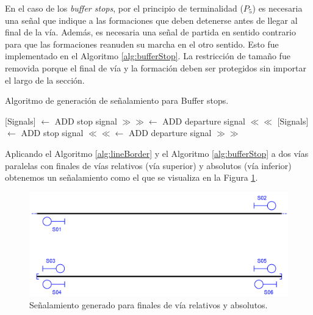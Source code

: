     En el caso de los \textit{buffer stops}, por el principio de terminalidad ($P_5$) es necesaria una señal que indique a las formaciones que deben detenerse antes de llegar al final de la vía. Además, es necesaria una señal de partida en sentido contrario para que las formaciones reanuden su marcha en el otro sentido. Esto fue implementado en el Algoritmo \ref{alg:bufferStop}. La restricción de tamaño fue removida porque el final de vía y la formación deben ser protegidos sin importar el largo de la sección.
    
    \begin{algorithm}[H]
        \caption{Algoritmo de generación de señalamiento para Buffer stops.}\label{alg:bufferStop}
        \DontPrintSemicolon
        \SetNoFillComment
        \LinesNotNumbered 
        {
            {
                [Signals] $\gets$ ADD stop signal $\gg\gg$\;
                [Signals] $\gets$ ADD departure signal $\ll\ll$\;
            }
            {
                [Signals] $\gets$ ADD stop signal $\ll\ll$\;
                [Signals] $\gets$ ADD departure signal $\gg\gg$\;
            }
        }
        \KwResult{[Signals]} 
    \end{algorithm}
    
    Aplicando el Algoritmo \ref{alg:lineBorder} y el Algoritmo \ref{alg:bufferStop} a dos vías paralelas con finales de vías relativos (vía superior) y absolutos (vía inferior) obtenemos un señalamiento como el que se visualiza en la Figura \ref{fig:signal_border}.
    
    \begin{figure}[H]
        \centering
        \includegraphics[width=1\textwidth]{Figuras/limites.PNG}
        \centering\caption{Señalamiento generado para finales de vía relativos y absolutos.}
        \label{fig:signal_border}
    \end{figure}
    
